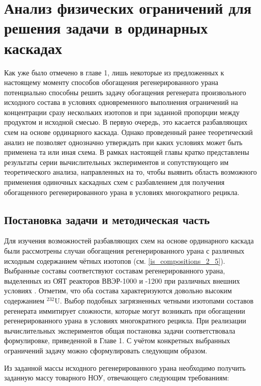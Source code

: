 \chapter{Анализ физических ограничений для решения задачи в ординарных каскадах}\label{ch:ch2}

Как уже было отмечено в главе 1, лишь некоторые из предложенных к настоящему моменту способов обогащения регенерированного урана потенциально способны решить задачу обогащения регенерата произвольного исходного состава в условиях одновременного выполнения ограничений на концентрации сразу нескольких изотопов и при заданной пропорции между продуктом и исходной смесью. В первую очередь, это касается разбавляющих схем на основе ординарного каскада. 
Однако проведенный ранее теоретический анализ не позволяет однозначно утверждать при каких условиях может быть применена та или иная схема. В рамках настоящей главы кратко представлены результаты серии вычислительных экспериментов и сопутствующего им теоретического анализа, направленных на то, чтобы выявить область возможного применения одиночных каскадных схем с разбавлением для получения обогащенного регенерированного урана в условиях многократного рецикла. 

\section{Постановка задачи и методическая часть}

Для изучения возможностей разбавляющих схем на основе ординарного каскада были рассмотрены случаи обогащения регенерированного урана с различных исходным содержанием чётных изотопов (см. \ref{is_compositions_2_5}). Выбранные составы соответствуют составам регенерированного урана, выделенных из ОЯТ реакторов ВВЭР-1000 и -1200 при различных внешних условиях \cite{palkinDesignanalyticalResearchRefinement2010,nevinicaToplivnyyCiklLegkovodnogo2019}. Отметим, что оба состава характеризуются довольно высоким содержанием $^{232}$U. Выбор подобных загрязненных четными изотопами составов регенерата иммитирует сложности, которые могут возникать при обогащении регенерированного урана в условиях многократного рецикла.  
При реализации вычислительных экспериментов общая постановка задачи соответствовала формулировке, приведенной в Главе 1. С учётом конкретных выбранных ограничений задачу можно сформулировать следующим образом.

Из заданной массы исходного регенерированного урана необходимо получить заданную массу товарного НОУ, отвечающего следующим требованиям:

